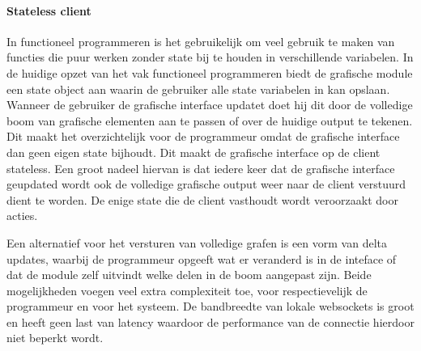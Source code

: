 \paragraph{Stateless client}
In functioneel programmeren is het gebruikelijk om veel gebruik te maken van functies die puur werken zonder state bij te houden in verschillende variabelen. In de huidige opzet van het vak functioneel programmeren biedt de grafische module een state object aan waarin de gebruiker alle state variabelen in kan opslaan. Wanneer de gebruiker de grafische interface updatet doet hij dit door de volledige boom van grafische elementen aan te passen of over de huidige output te tekenen. Dit maakt het overzichtelijk voor de programmeur omdat de grafische interface dan geen eigen state bijhoudt. Dit maakt de grafische interface op de client stateless. Een groot nadeel hiervan is dat iedere keer dat de grafische interface geupdated wordt ook de volledige grafische output weer naar de client verstuurd dient te worden. De enige state die de client vasthoudt wordt veroorzaakt door acties.

Een alternatief voor het versturen van volledige grafen is een vorm van delta updates, waarbij de programmeur opgeeft wat er veranderd is in de inteface of dat de module zelf uitvindt welke delen in de boom aangepast zijn. Beide mogelijkheden voegen veel extra complexiteit toe, voor respectievelijk de programmeur en voor het systeem. De bandbreedte van lokale websockets is groot en heeft geen last van latency waardoor de performance van de connectie hierdoor niet beperkt wordt.
